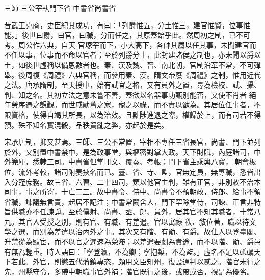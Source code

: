 
\begin{pinyinscope}

 三師
 三公宰執門下省
 中書省尚書省



 昔武王克商，史臣紀其成功，有曰：「列爵惟五，分土惟三，建官惟賢，位事惟能。」後世曰爵，曰官，曰職，分而任之，其原蓋始乎此。然周初之制，已不可考。周公作六典，自天
 官塚宰而下，小大高下，各帥其屬以任其事，未聞建官而不任以事，位事而不命以官者；至於列爵分土，此封建諸侯之制也，亦未聞以爵以土，如後世虛稱以備恩數者也。秦、漢及魏、晉、南北朝，官制沿革不常，不可殫舉。後周復《周禮》六典官稱，而參用秦、漢。隋文帝廢《周禮》之制，惟用近代之法。唐承隋制，至天授中，始有試官之格，又有員外之置，尋為檢校、試、攝、判、知之名。其初立法之意未嘗不善，蓋欲以名器事功甄別能否，又使不肖者
 絕年勞序遷之覬覦。而世戚勛舊之家，寵之以祿，而不責以猷為。其居位任事者，不限資格，使得自竭其所長，以為治效。且黜陟進退之際，權歸於上，而有司若不得預。殊不知名實混殽，品秩貿亂之弊，亦起於是矣。



 宋承唐制，抑又甚焉。三師、三公不常置，宰相不專任三省長官，尚書、門下並列於外，又別置中書禁中，是為政事堂，與樞密對掌大政。天下財賦，內庭諸司，中外筦庫，悉隸三司。中書省但掌冊文、覆奏、考帳；門下省主乘輿八寶，
 朝會板位，流外考較，諸司附奏挾名而已。臺、省、寺、監，官無定員，無專職，悉皆出入分蒞庶務。故三省、六曹、二十四司，類以他官主判，雖有正官，非別敕不治本司事，事之所寄，十亡二三。故中書令、侍中、尚書令不預朝政，侍郎、給事不領省職，諫議無言責，起居不記注；中書常闕舍人，門下罕除堂侍，司諫、正言非特旨供職亦不任諫諍。至於僕射、尚書、丞、郎、員外，居其官不知其職者，十常八九。其官人受授之別，則有官、有職、有差遣。官以寓祿
 秩、敘位著，職以待文學之選，而別為差遣以治內外之事。其次又有階、有勛、有爵。故仕人以登臺閣、升禁從為顯宦，而不以官之遲速為榮滯；以差遣要劇為貴途，而不以階、勛、爵邑有無為輕重。時人語曰：「寧登瀛，不為卿；寧抱槧，不為監。」虛名不足以砥礪天下若此。外官，則懲五代藩鎮專恣，頗用文臣知州，復設通判以貳之。階官未行之先，州縣守令，多帶中朝職事官外補；階官既行之後，或帶或否，視是為優劣。




\end{pinyinscope}
